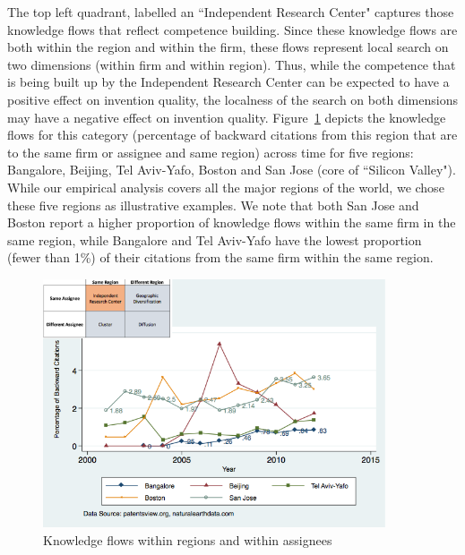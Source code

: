 \documentclass[12pt,letterpaper]{article}
\begin{document}
The top left quadrant, labelled an ``Independent Research Center" captures those knowledge flows that reflect competence building. Since these knowledge flows  are both within the region and within the firm, these flows represent local search on two dimensions (within firm and within region).  Thus, while the competence that is being built up by the Independent Research Center can be expected to have a positive effect on invention quality, the localness of the search on both dimensions may have a negative effect on invention quality. Figure~\ref{fig:SMSSameRegionSameAssigneeFlows} depicts the knowledge flows for this category (percentage of backward citations from this region that are to the same firm or assignee and same region) across time for five regions: Bangalore, Beijing, Tel Aviv-Yafo, Boston and San Jose (core of ``Silicon Valley"). While our empirical analysis covers all the major regions of the world, we chose these five regions as illustrative examples. We note that both San Jose and Boston report a higher proportion of knowledge flows within the same firm in the same region, while Bangalore and Tel Aviv-Yafo have the lowest proportion (fewer than 1\%) of their citations from the same firm within the same region. \par

\begin{figure}[h]
\begin{centering}
  \caption{Knowledge flows within regions and within assignees}
  \label{fig:SMSSameRegionSameAssigneeFlows}
  \includegraphics[width=0.90\textwidth]{SMSSameRegionSameAssigneeFlows}
\end{centering}
\end{figure}
\end{document}
